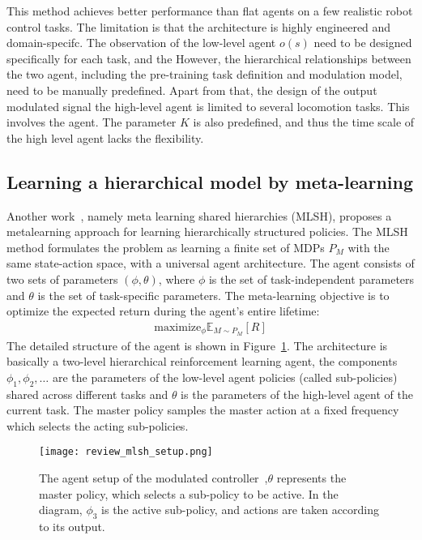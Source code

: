 This method achieves better performance than flat agents on a few realistic robot control tasks. The limitation is that the architecture is highly engineered and domain-specifc. The observation of the low-level agent $o(s)$ need to be designed specifically for each task, and the However, the hierarchical relationships between the two agent, including the pre-training task definition and modulation model, need to be manually predefined. Apart from that, the design of the output modulated signal the high-level agent is limited to several locomotion tasks. This involves the agent. The parameter $K$ is also predefined, and thus the time scale of the high level agent lacks the flexibility.

\subsection{Learning a hierarchical model by meta-learning}
Another work~\cite{frans2017meta}, namely meta learning shared hierarchies (MLSH), proposes a metalearning approach for learning hierarchically structured policies.
The MLSH method formulates the problem as learning a finite set of MDPs $P_M$ with the same state-action space, with a universal agent architecture. The agent consists of two sets of parameters $(\phi,\theta)$, where $\phi$ is the set of task-independent parameters and $\theta$ is the set of task-specific parameters. The meta-learning objective is to optimize the expected return during the agent's entire lifetime:
\begin{align}
\mathrm{maximize}_\phi \mathbb{E}_{M\sim P_M}[R]
\end{align}
The detailed structure of the agent is shown in Figure~\ref{review_mlsh_arch}. The architecture is basically a two-level hierarchical reinforcement learning agent, the components $\phi_1,\phi_2,\dots$ are the parameters of the low-level agent policies (called sub-policies) shared across different tasks and $\theta$ is the parameters of the high-level agent of the current task. The master policy samples the master action at a fixed frequency which selects the acting sub-policies.
\begin{figure}[h]
	\texttt{[image: review\_mlsh\_setup.png]}
	\centering
	\caption{The agent setup of the modulated controller~\cite{frans2017meta},$\theta$ represents the master policy, which selects
		a sub-policy to be active. In the diagram, $\phi_3$ is the active sub-policy, and actions are taken according
		to its output.}\label{review_mlsh_arch}
\end{figure}
